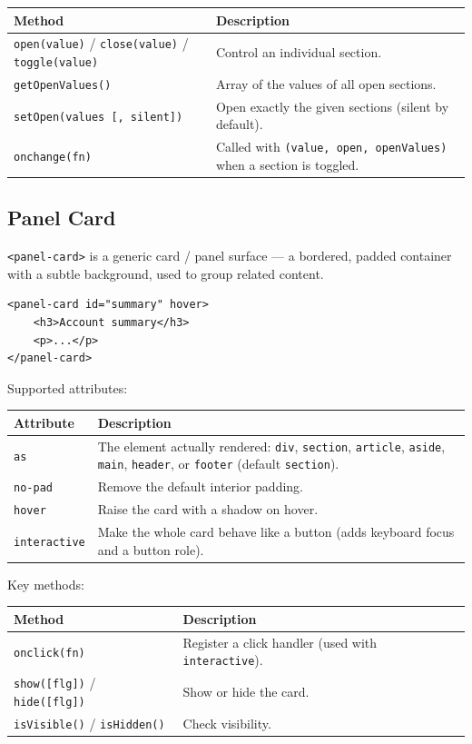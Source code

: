 \begin{longtable}{P{4.8cm}P{5.7cm}}
\toprule
\textbf{Method} & \textbf{Description} \\
\midrule
\endhead
\texttt{open(value)} / \texttt{close(value)} / \texttt{toggle(value)} & Control an individual section. \\
\texttt{getOpenValues()} & Array of the values of all open sections. \\
\texttt{setOpen(values [, silent])} & Open exactly the given sections (silent by default). \\
\texttt{onchange(fn)} & Called with \texttt{(value, open, openValues)} when a section is toggled. \\
\bottomrule
\end{longtable}

\subsection{Panel Card}
\label{sec:comp-panel-card}

\texttt{<panel-card>} is a generic card / panel surface --- a bordered, padded container with a subtle background, used to group related content.

\begin{lstlisting}[style=html]
<panel-card id="summary" hover>
    <h3>Account summary</h3>
    <p>...</p>
</panel-card>
\end{lstlisting}

\noindent
Supported attributes:

\begin{longtable}{P{3.8cm}P{6.7cm}}
\toprule
\textbf{Attribute} & \textbf{Description} \\
\midrule
\endhead
\texttt{as} & The element actually rendered: \texttt{div}, \texttt{section}, \texttt{article}, \texttt{aside}, \texttt{main}, \texttt{header}, or \texttt{footer} (default \texttt{section}). \\
\texttt{no-pad} & Remove the default interior padding. \\
\texttt{hover} & Raise the card with a shadow on hover. \\
\texttt{interactive} & Make the whole card behave like a button (adds keyboard focus and a button role). \\
\bottomrule
\end{longtable}

\noindent
Key methods:

\begin{longtable}{P{4.8cm}P{5.7cm}}
\toprule
\textbf{Method} & \textbf{Description} \\
\midrule
\endhead
\texttt{onclick(fn)} & Register a click handler (used with \texttt{interactive}). \\
\texttt{show([flg])} / \texttt{hide([flg])} & Show or hide the card. \\
\texttt{isVisible()} / \texttt{isHidden()} & Check visibility. \\
\bottomrule
\end{longtable}

